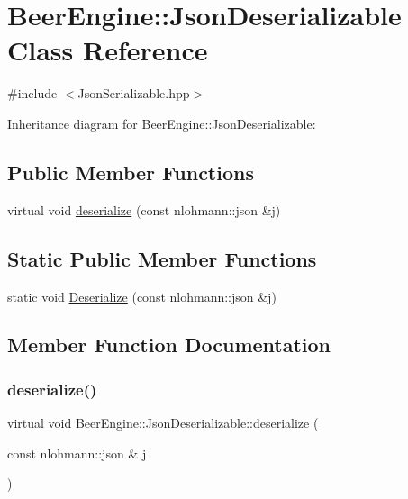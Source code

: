 \hypertarget{class_beer_engine_1_1_json_deserializable}{}\section{Beer\+Engine\+:\+:Json\+Deserializable Class Reference}
\label{class_beer_engine_1_1_json_deserializable}


{\ttfamily \#include $<$Json\+Serializable.\+hpp$>$}



Inheritance diagram for Beer\+Engine\+:\+:Json\+Deserializable\+:
\subsection*{Public Member Functions}
\begin{DoxyCompactItemize}
\item 
virtual void \mbox{\hyperlink{class_beer_engine_1_1_json_deserializable_ae1ce96bc441e544e7339641d80925726}{deserialize}} (const nlohmann\+::json \&j)
\end{DoxyCompactItemize}
\subsection*{Static Public Member Functions}
\begin{DoxyCompactItemize}
\item 
static void \mbox{\hyperlink{class_beer_engine_1_1_json_deserializable_af4c5582f75eb96988c5d4ff546218e1e}{Deserialize}} (const nlohmann\+::json \&j)
\end{DoxyCompactItemize}


\subsection{Member Function Documentation}
\mbox{\label{class_beer_engine_1_1_json_deserializable_ae1ce96bc441e544e7339641d80925726}} 
\subsubsection{\texorpdfstring{deserialize()}{deserialize()}}
{\footnotesize\ttfamily virtual void Beer\+Engine\+::\+Json\+Deserializable\+::deserialize (\begin{DoxyParamCaption}\item[{const nlohmann\+::json \&}]{j }\end{DoxyParamCaption})\hspace{0.3cm}{\ttfamily [virtual]}}



